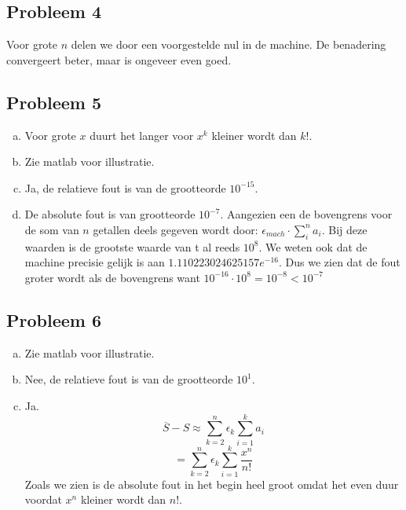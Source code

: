 \documentclass[12pt,a4paper]{article}
\begin{document}
\subsection{Probleem 4}
Voor grote $n$ delen we door een voorgestelde nul in de machine.
De benadering convergeert beter, maar is ongeveer even goed.
\subsection{Probleem 5}
\begin{enumerate}[(a)]
\item Voor grote $x$ duurt het langer voor $x^k$ kleiner wordt dan $k!$.
\item Zie matlab voor illustratie.
\item Ja, de relatieve fout is van de grootteorde $10^{-15}$.
\item De absolute fout is van grootteorde $10^{-7}$. Aangezien een de bovengrens voor de som van $n$ getallen deels gegeven wordt door: $\epsilon_{mach} \cdot \sum_i^n a_i$. Bij deze waarden is de grootste waarde van t al reeds $10^8$. We weten ook dat de machine precisie gelijk is aan $1.110223024625157e^{-16}$. Dus we zien dat de fout groter wordt als de bovengrens want $10^{-16} \cdot 10^8 = 10^{-8} < 10^{-7}$
\end{enumerate}

\subsection{Probleem 6}
\begin{enumerate}[(a)]
\item Zie matlab voor illustratie.
\item Nee, de relatieve fout is van de grootteorde $10^{1}$.
\item Ja.
\[
\overline{S}-S \approx \sum_{k=2}^n\epsilon_k\sum_{i=1}^ka_i
\]
\[
= \sum_{k=2}^n\epsilon_k\sum_{i=1}^k \frac{x^n}{n!}
\]
Zoals we zien is de absolute fout in het begin heel groot omdat het even duur voordat $x^n$ kleiner wordt dan $n!$.
\end{enumerate}
\end{document}
